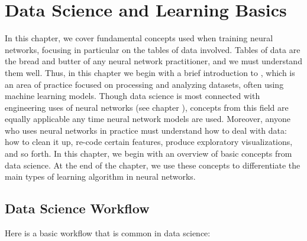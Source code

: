 \chapter{Data Science and Learning Basics}\label{ch_data_science}

In this chapter, we cover fundamental concepts used when training neural networks, focusing in particular on the tables of data involved. Tables of data are the bread and butter of any neural network practitioner, and we must understand them well. Thus, in this chapter we begin with a brief introduction to , which is an area of practice focused on processing and analyzing datasets, often using machine learning models. Though data science is most connected with engineering uses of neural networks (see chapter ), concepts from this field are equally applicable any time neural network models are used. Moreover, anyone who uses neural networks in practice must understand how to deal with data: how to clean it up, re-code certain features, produce exploratory visualizations, and so forth. In this chapter, we begin with an overview of basic concepts from data science. At the end of the chapter, we use these concepts to differentiate the main types of learning algorithm in neural networks.

\section{Data Science Workflow}

Here is a basic workflow that is common in data science:

